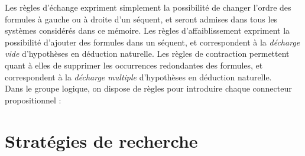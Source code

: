 \documentclass[12pt]{report}
\newcommand{\lto}{\Rightarrow}
\newcommand{\seq}{\vdash}
\newcommand{\irule}[1]{\footnotesize$#1$}
\newcommand{\iruleL}[1]{\irule{{#1}\seq}}
\newcommand{\iruleR}[1]{\irule{\seq{#1}}}
\begin{document}
Les règles d’échange expriment simplement la possibilité de changer l’ordre des formules à gauche ou à droite d’un séquent, et seront admises dans tous les systèmes considérés dans ce mémoire. Les règles d’affaiblissement expriment la possibilité d’ajouter des formules dans un séquent, et correspondent à la \emph{décharge vide} d’hypothèses en déduction naturelle. Les règles de contraction permettent quant à elles de supprimer les occurrences redondantes des formules, et correspondent à la \emph{décharge multiple} d’hypothèses en déduction naturelle.\\

Dans le groupe logique, on dispose de règles pour introduire chaque connecteur propositionnel :


\chapter*{Stratégies de recherche}
\end{document}
